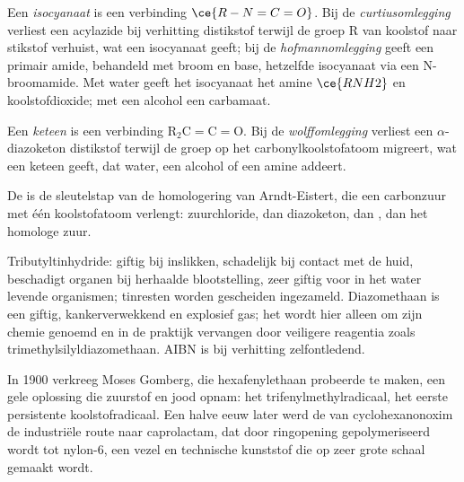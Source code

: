 \begin{definition}\label{def:b3:radicals-carbenes:curtius}
Een \emph{isocyanaat} is een verbinding $\ce{R-N=C=O}$. Bij de \emph{curtiusomlegging}
 verliest een acylazide bij verhitting distikstof
terwijl de groep R van koolstof naar stikstof verhuist, wat een isocyanaat
geeft; bij de \emph{hofmannomlegging} geeft een
primair amide, behandeld met broom en base, hetzelfde isocyanaat via een
N-broomamide. Met water geeft het isocyanaat het amine $\ce{RNH2}$ en koolstofdioxide; met
een alcohol een carbamaat.
\end{definition}

\begin{definition}\label{def:b3:radicals-carbenes:wolff}
Een \emph{keteen} is een verbinding $\mathrm{R_2C{=}C{=}O}$. Bij de \emph{wolffomlegging}
 verliest een $\alpha$-diazoketon distikstof
terwijl de groep op het carbonylkoolstofatoom migreert, wat een keteen
geeft, dat water, een alcohol of een amine addeert.
\end{definition}

De  is de sleutelstap van de homologering van
Arndt-Eistert, die een carbonzuur met één koolstofatoom verlengt:
zuurchloride, dan diazoketon, dan , dan het homologe zuur.

\begin{safety}{}
Tributyltinhydride: giftig bij inslikken, schadelijk bij contact met de
huid, beschadigt organen bij herhaalde blootstelling, zeer giftig voor in
het water levende organismen; tinresten worden gescheiden ingezameld.
Diazomethaan is een giftig, kankerverwekkend en explosief gas; het wordt
hier alleen om zijn chemie genoemd en in de praktijk vervangen door
veiligere reagentia zoals trimethylsilyldiazomethaan. AIBN is bij
verhitting zelfontledend.
\end{safety}

\begin{history}
In 1900 verkreeg Moses Gomberg, die hexafenylethaan probeerde te maken,
een gele oplossing die zuurstof en jood opnam: het trifenylmethylradicaal,
het eerste persistente koolstofradicaal. Een halve eeuw later werd de
 van cyclohexanonoxim de industriële route naar
caprolactam, dat door ringopening gepolymeriseerd wordt tot nylon-6, een
vezel en technische kunststof die op zeer grote schaal gemaakt wordt.
\end{history}


